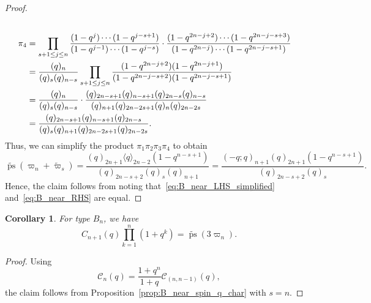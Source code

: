 \documentclass[11pt, leqno]{amsart}
\theoremstyle{plain}
\newtheorem{corollary}[theorem]{Corollary}
\theoremstyle{definition}
\numberwithin{equation}{section}
\newcommand{\fw}{\varpi} %
\newcommand{\tfw}{\widetilde{\fw}} %
\newcommand{\Cat}{\mathcal{C}} %
\newcommand{\qPdf}[1]{\langle q \rangle_{#1}} %
\newcommand{\ps}{\operatorname{ps}} %
\newcommand{\nps}{\widetilde{\ps}} %
\begin{document}
\begin{proof}
\begin{align*}
\allowdisplaybreaks  \\ \pi_4 & = \prod_{s+1 \leq j \leq n} \dfrac{(1-q^j) \cdots (1-q^{j-s+1})}{(1-q^{j-1}) \cdots (1-q^{j-s})} \cdot \dfrac{(1-q^{2n-j+2}) \cdots (1-q^{2n-j-s+3})}{(1-q^{2n-j}) \cdots (1-q^{2n-j-s+1})}
\allowdisplaybreaks  \\ & = \dfrac{(q)_n}{(q)_s (q)_{n-s}} \prod_{s+1 \leq j \leq n} \dfrac{(1-q^{2n-j+2}) (1-q^{2n-j+1})}{(1-q^{2n-j-s+2}) (1-q^{2n-j-s+1})}
\allowdisplaybreaks  \\ & = \dfrac{(q)_n}{(q)_s (q)_{n-s}} \cdot \dfrac{(q)_{2n-s+1} (q)_{n-s+1} (q)_{2n-s} (q)_{n-s}}{(q)_{n+1} (q)_{2n-2s+1} (q)_{n} (q)_{2n-2s}}
\allowdisplaybreaks  \\ & = \dfrac{(q)_{2n-s+1} (q)_{n-s+1} (q)_{2n-s}}{(q)_{s} (q)_{n+1} (q)_{2n-2s+1} (q)_{2n-2s}}.
\end{align*}
Thus, we can simplify the product $\pi_1 \pi_2 \pi_3 \pi_4$ to obtain
\begin{equation}
\label{eq:B_near_LHS_simplified}
\nps(\fw_n + \tfw_s) = \dfrac{(q)_{2n+1} \qPdf{2n-2} (1 - q^{n-s+1})}{(q)_{2n-s+2} (q)_{s} (q)_{n+1}}
= \dfrac{(-q;q)_{n+1} (q)_{2n+1} (1 - q^{n-s+1})}{(q)_{2n-s+2} (q)_{s}}.
\end{equation}
Hence, the claim follows from noting that~\eqref{eq:B_near_LHS_simplified} and~\eqref{eq:B_near_RHS} are equal.
\end{proof}

\begin{corollary}
\label{cor:catalan_q2}
For type $B_n$, we have
\[
C_{n+1}(q) \prod_{k=1}^n (1 + q^k) = \nps(3\fw_n).
\]
\end{corollary}

\begin{proof}
Using
\[
\Cat_n(q) = \dfrac{1+ q^n}{1 + q} \Cat_{(n,n-1)}(q),
\]
the claim follows from Proposition~\ref{prop:B_near_spin_q_char} with $s = n$.
\end{proof}
\end{document}
